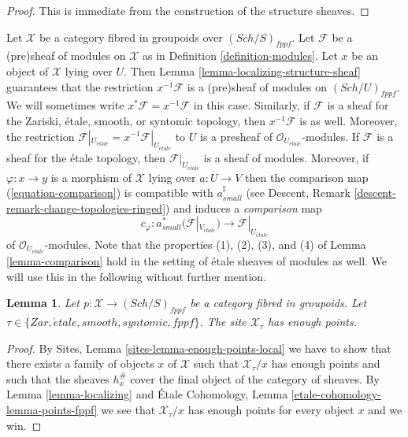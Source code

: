 \documentclass{stacks-project}
\theoremstyle{plain}
\newtheorem{lemma}[subsection]{Lemma}
\theoremstyle{definition}
\theoremstyle{remark}
\numberwithin{equation}{subsection}
\def\Sch{\mathit{Sch}}
\def\etale{{\acute{e}tale}}
\begin{document}
\begin{proof}
This is immediate from the construction of the structure sheaves.
\end{proof}

\noindent
Let $\mathcal{X}$ be a category fibred in groupoids over $(\Sch/S)_{fppf}$.
Let $\mathcal{F}$ be a (pre)sheaf of modules on $\mathcal{X}$ as in
Definition \ref{definition-modules}.
Let $x$ be an object of $\mathcal{X}$ lying over $U$. Then
Lemma \ref{lemma-localizing-structure-sheaf}
guarantees that the restriction
$x^{-1}\mathcal{F}$ is a (pre)sheaf of modules on $(\Sch/U)_{fppf}$.
We will sometimes write $x^*\mathcal{F} = x^{-1}\mathcal{F}$ in this case.
Similarly, if $\mathcal{F}$ is a sheaf for the Zariski, \'etale, smooth,
or syntomic topology, then $x^{-1}\mathcal{F}$ is as well. Moreover, the
restriction
$\mathcal{F}|_{U_\etale} = x^{-1}\mathcal{F}|_{U_\etale}$
to $U$ is a presheaf of $\mathcal{O}_{U_\etale}$-modules.
If $\mathcal{F}$ is a sheaf for the \'etale topology, then
$\mathcal{F}|_{U_\etale}$ is a sheaf of modules. Moreover,
if $\varphi : x \to y$ is a morphism of $\mathcal{X}$ lying over
$a : U \to V$ then the comparison map (\ref{equation-comparison})
is compatible with $a_{small}^\sharp$ (see
Descent, Remark \ref{descent-remark-change-topologies-ringed})
and induces a {\it comparison} map
\begin{equation}
\label{equation-comparison-modules}
c_\varphi : a_{small}^*(\mathcal{F}|_{V_\etale})
\longrightarrow
\mathcal{F}|_{U_\etale}
\end{equation}
of $\mathcal{O}_{U_\etale}$-modules.
Note that the properties (1), (2), (3), and (4) of
Lemma \ref{lemma-comparison}
hold in the setting of \'etale sheaves of modules as well.
We will use this in the following without further mention.

\begin{lemma}
\label{lemma-enough-points}
Let $p : \mathcal{X} \to (\Sch/S)_{fppf}$ be a category fibred
in groupoids. Let $\tau \in \{Zar, \etale, smooth, syntomic, fppf\}$.
The site $\mathcal{X}_\tau$ has enough points.
\end{lemma}

\begin{proof}
By
Sites, Lemma \ref{sites-lemma-enough-points-local}
we have to show that there exists a family of objects $x$ of $\mathcal{X}$
such that $\mathcal{X}_\tau/x$ has enough points and such that the sheaves
$h_x^\#$ cover the final object of the category of sheaves.
By
Lemma \ref{lemma-localizing}
and
\'Etale Cohomology, Lemma \ref{etale-cohomology-lemma-points-fppf}
we see that $\mathcal{X}_\tau/x$ has enough points for every object
$x$ and we win.
\end{proof}
\end{document}
